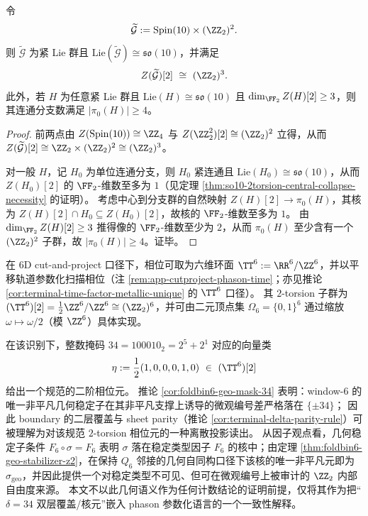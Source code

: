 

\begin{corollary}\label{cor:so10-2torsion-minimal-disconnected-repair}
令
\[
\widetilde{\mathcal G}:=\mathrm{Spin}(10)\times (\ZZ_2)^2.
\]
则 \(\widetilde{\mathcal G}\) 为紧 Lie 群且 \(\mathrm{Lie}(\widetilde{\mathcal G})\cong \mathfrak{so}(10)\)，并满足
\[
Z(\widetilde{\mathcal G})[2]\ \cong\ (\ZZ_2)^3.
\]
此外，若 \(H\) 为任意紧 Lie 群且 \(\mathrm{Lie}(H)\cong \mathfrak{so}(10)\) 且 \(\dim_{\FF_2} Z(H)[2]\ge 3\)，则其连通分支数满足 \(|\pi_0(H)|\ge 4\)。
\end{corollary}
\begin{proof}
前两点由 \(Z(\mathrm{Spin}(10))\cong \ZZ_4\) 与 \(Z(\ZZ_2^2)[2]\cong (\ZZ_2)^2\) 立得，从而 \(Z(\widetilde{\mathcal G})[2]\cong \ZZ_2\times(\ZZ_2)^2\cong(\ZZ_2)^3\)。
\par
对一般 \(H\)，记 \(H_0\) 为单位连通分支，则 \(H_0\) 紧连通且 \(\mathrm{Lie}(H_0)\cong\mathfrak{so}(10)\)，从而 \(Z(H_0)[2]\) 的 \(\FF_2\)-维数至多为 \(1\)（见定理 \ref{thm:so10-2torsion-central-collapse-necessity} 的证明）。
考虑中心到分支群的自然映射 \(Z(H)[2]\to \pi_0(H)\)，其核为 \(Z(H)[2]\cap H_0\subseteq Z(H_0)[2]\)，故核的 \(\FF_2\)-维数至多为 \(1\)。
由 \(\dim_{\FF_2} Z(H)[2]\ge 3\) 推得像的 \(\FF_2\)-维数至少为 \(2\)，从而 \(\pi_0(H)\) 至少含有一个 \((\ZZ_2)^2\) 子群，故 \(|\pi_0(H)|\ge 4\)。证毕。
\end{proof}

\begin{remark}[\texorpdfstring{$\delta=34$}{δ=34} 的 phason \texorpdfstring{$2$}{2}-torsion 解释（作为几何语义）]\label{rem:bdry-delta34-phason-2torsion}
在 6D cut-and-project 口径下，相位可取为六维环面 \(\TT^6:=\RR^6/\ZZ^6\)，并以平移轨道参数化扫描相位（注 \ref{rem:app-cutproject-phason-time}；亦见推论 \ref{cor:terminal-time-factor-metallic-unique} 的 \(\TT^6\) 口径）。
其 \(2\)-torsion 子群为
\(
(\TT^6)[2]=\frac12\ZZ^6/\ZZ^6\cong (\ZZ_2)^6
\)，并可由二元顶点集 \(\Omega_6=\{0,1\}^6\) 通过缩放 \(\omega\mapsto \omega/2\)（模 \(\ZZ^6\)）具体实现。
\par
在该识别下，整数掩码 \(34=100010_2=2^5+2^1\) 对应的向量类
\[
\eta:=\frac12(1,0,0,0,1,0)\ \in\ (\TT^6)[2]
\]
给出一个规范的二阶相位元。
推论 \ref{cor:foldbin6-geo-mask-34} 表明：window-\(6\) 的唯一非平凡几何稳定子在其非平凡支撑上诱导的微观编号差严格落在 \(\{\pm 34\}\)；
因此 boundary 的二层覆盖与 sheet parity（推论 \ref{cor:terminal-delta-parity-rule}）可被理解为对该规范 \(2\)-torsion 相位元的一种离散投影读出。
从因子观点看，几何稳定子条件 \(F_6\circ\sigma=F_6\) 表明 \(\sigma\) 落在稳定类型因子 \(F_6\) 的核中；由定理 \ref{thm:foldbin6-geo-stabilizer-z2}，在保持 \(Q_6\) 邻接的几何自同构口径下该核的唯一非平凡元即为 \(\sigma_{\mathrm{geo}}\)，并因此提供一个对稳定类型不可见、但可在微观编号上被审计的 \(\ZZ_2\) 内部自由度来源。
本文不以此几何语义作为任何计数结论的证明前提，仅将其作为把“\(\delta=34\) 双层覆盖/核元”嵌入 phason 参数化语言的一个一致性解释。
\end{remark}

